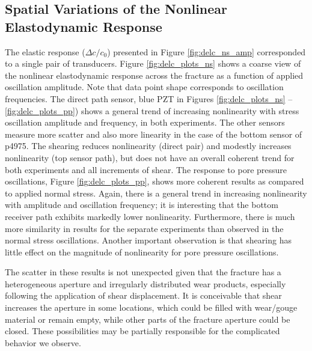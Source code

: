 \documentclass[draft]{agujournal2019}
\begin{document}
\subsection{Spatial Variations of the Nonlinear Elastodynamic Response}

The elastic response ($ \Delta c/c_0 $) presented in Figure \ref{fig:delc_ns_amp} corresponded to a single pair of transducers.  
Figure \ref{fig:delc_plots_ns} shows a coarse view of the nonlinear elastodynamic response across the fracture as a function of applied oscillation amplitude. Note that data point shape corresponds to oscillation frequencies. The direct path sensor, blue PZT in Figures \ref{fig:delc_plots_ns} -- \ref{fig:delc_plots_pp}) shows a general trend of increasing nonlinearity with stress oscillation amplitude and frequency, in both experiments. The other sensors measure more scatter and also more linearity in the case of the bottom sensor of p4975. The shearing reduces nonlinearity (direct pair) and modestly increases nonlinearity (top sensor path), but does not have an overall coherent trend for both experiments and all increments of shear.
The response to pore pressure oscillations, Figure \ref{fig:delc_plots_pp}, shows more coherent results as compared to applied normal stress. Again, there is a general trend in increasing nonlinearity with amplitude and oscillation frequency; it is interesting that the bottom receiver path exhibits markedly lower nonlinearity. Furthermore, there is much more similarity in results for the separate experiments than observed in the normal stress oscillations. Another important observation is that shearing has little effect on the magnitude of nonlinearity for pore pressure oscillations.

The scatter in these results is not unexpected given that the fracture has a heterogeneous aperture and irregularly distributed wear products, especially following the application of shear displacement. It is conceivable that shear increases the aperture in some locations, which could be filled with wear/gouge material or remain empty, while other parts of the fracture aperture could be closed. These possibilities may be partially responsible for the complicated behavior we observe.
\end{document}
